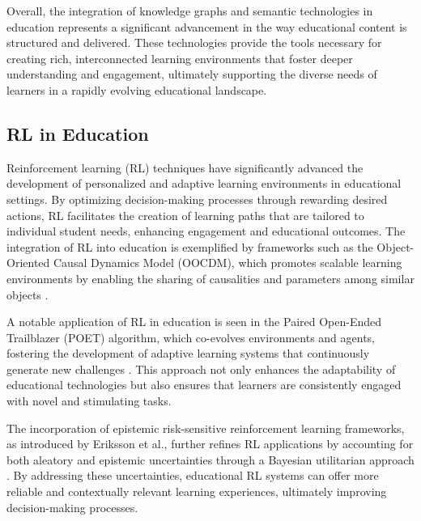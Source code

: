 Overall, the integration of knowledge graphs and semantic technologies in education represents a significant advancement in the way educational content is structured and delivered. These technologies provide the tools necessary for creating rich, interconnected learning environments that foster deeper understanding and engagement, ultimately supporting the diverse needs of learners in a rapidly evolving educational landscape.



\subsection{RL in Education} \label{subsec:RL in Education}



Reinforcement learning (RL) techniques have significantly advanced the development of personalized and adaptive learning environments in educational settings. By optimizing decision-making processes through rewarding desired actions, RL facilitates the creation of learning paths that are tailored to individual student needs, enhancing engagement and educational outcomes. The integration of RL into education is exemplified by frameworks such as the Object-Oriented Causal Dynamics Model (OOCDM), which promotes scalable learning environments by enabling the sharing of causalities and parameters among similar objects \cite{yu2024learningcausaldynamicsmodels}.



A notable application of RL in education is seen in the Paired Open-Ended Trailblazer (POET) algorithm, which co-evolves environments and agents, fostering the development of adaptive learning systems that continuously generate new challenges \cite{wang2019pairedopenendedtrailblazerpoet}. This approach not only enhances the adaptability of educational technologies but also ensures that learners are consistently engaged with novel and stimulating tasks.



The incorporation of epistemic risk-sensitive reinforcement learning frameworks, as introduced by Eriksson et al., further refines RL applications by accounting for both aleatory and epistemic uncertainties through a Bayesian utilitarian approach \cite{eriksson2019epistemicrisksensitivereinforcementlearning}. By addressing these uncertainties, educational RL systems can offer more reliable and contextually relevant learning experiences, ultimately improving decision-making processes.




